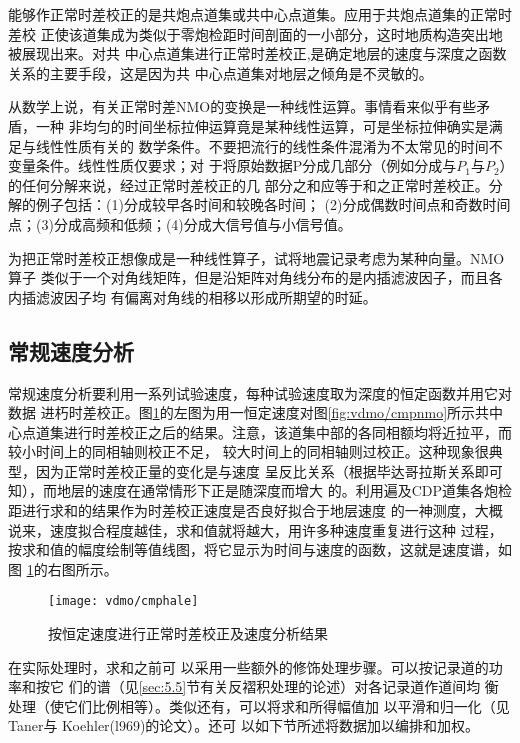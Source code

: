 能够作正常时差校正的是共炮点道集或共中心点道集。应用于共炮点道集的正常时差校
正使该道集成为类似于零炮检距时间剖面的一小部分，这时地质构造突出地被展现出来。对共
中心点道集进行正常时差校正,是确定地层的速度与深度之函数关系的主要手段，这是因为共
中心点道集对地层之倾角是不灵敏的。

从数学上说，有关正常时差NMO的变换是一种线性运算。事情看来似乎有些矛盾，一种
非均匀的时间坐标拉伸运算竟是某种线性运算，可是坐标拉伸确实是满足与线性性质有关的
数学条件。不要把流行的线性条件混淆为不太常见的时间不变量条件。线性性质仅要求；对
于将原始数据P分成几部分（例如分成与$P_1$与$P_2$）的任何分解来说，经过正常时差校正的几
部分之和应等于和之正常时差校正。分解的例子包括：(1)分成较早各时间和较晚各时间；
(2)分成偶数时间点和奇数时间点；(3)分成高频和低频；(4)分成大信号值与小信号值。

为把正常时差校正想像成是一种线性算子，试将地震记录考虑为某种向量。NMO算子
类似于一个对角线矩阵，但是沿矩阵对角线分布的是内插滤波因子，而且各内插滤波因子均
有偏离对角线的相移以形成所期望的时延。

\subsection{常规速度分析}
\label{sec:3.5.2}

常规速度分析要利用一系列试验速度，每种试验速度取为深度的恒定函数并用它对数据
进朽时差校正。图\ref{fig:vdmo/cmphale}的左图为用一恒定速度对图\ref{fig:vdmo/cmpnmo}所示共中心点道集进行时差校正之后的结果。注意，该道集中部的各同相额均将近拉平，而较小时间上的同相轴则校正不足，
较大时间上的同相轴则过校正。这种现象很典型，因为正常时差校正量的变化是与速度
呈反比关系（根据毕达哥拉斯关系即可知），而地层的速度在通常情形下正是随深度而增大
的。利用遍及CDP道集各炮检距进行求和的结果作为时差校正速度是否良好拟合于地层速度
的一神测度，大概说来，速度拟合程度越佳，求和值就将越大，用许多种速度重复进行这种
过程，按求和值的幅度绘制等值线图，将它显示为时间与速度的函数，这就是速度谱，如图
\ref{fig:vdmo/cmphale}的右图所示。

\begin{figure}[H]
\centering
\texttt{[image: vdmo/cmphale]}
\caption[cmphale]{按恒定速度进行正常时差校正及速度分析结果}
\label{fig:vdmo/cmphale}
\end{figure}

在实际处理时，求和之前可
以采用一些额外的修饰处理步骤。可以按记录道的功率和按它
们的谱（见\ref{sec:5.5}节有关反褶积处理的论述）对各记录道作道间均
衡处理（使它们比例相等）。类似还有，可以将求和所得幅值加
以平滑和归一化（见Taner与 Koehler(l969)的论文）。还可
以如下节所述将数据加以编排和加权。

